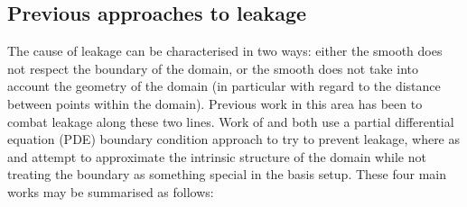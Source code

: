 \subsection{Previous approaches to leakage}
\label{intro-leakageapproaches}

The cause of leakage can be characterised in two ways: either the smooth does not respect the boundary of the domain, or the smooth does not take into account the geometry of the domain (in particular with regard to the distance between points within the domain). Previous work in this area has been to combat leakage along these two lines. Work of  and  both use a partial differential equation (PDE) boundary condition approach to try to prevent leakage, where as  and   attempt to approximate the intrinsic structure of the domain while not treating the boundary as something special in the basis setup. These four main works may be summarised as follows:

